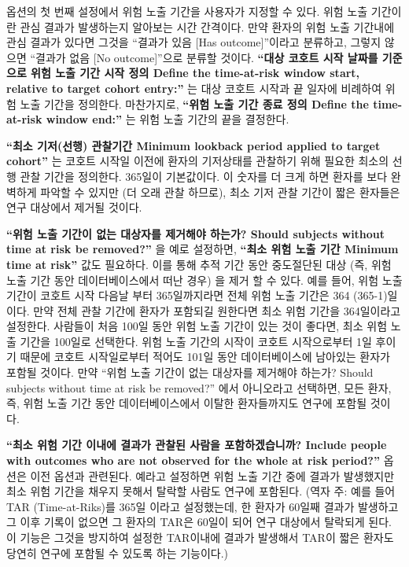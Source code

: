 \documentclass[10.5pt]{book}
\theoremstyle{definition}
\theoremstyle{definition}
\theoremstyle{definition}
\theoremstyle{remark}
\begin{document}
옵션의 첫 번째 설정에서 위험 노출 기간을 사용자가 지정할 수 있다. 위험
노출 기간이란 관심 결과가 발생하는지 알아보는 시간 간격이다. 만약 환자의
위험 노출 기간내에 관심 결과가 있다면 그것을 ``결과가 있음 {[}Has
outcome{]}''이라고 분류하고, 그렇지 않으면 ``결과가 없음 {[}No
outcome{]}''으로 분류할 것이다. \textbf{``대상 코호트 시작 날짜를
기준으로 위험 노출 기간 시작 정의 Define the time-at-risk window start,
relative to target cohort entry:''} 는 대상 코호트 시작과 끝 일자에
비례하여 위험 노출 기간을 정의한다. 마찬가지로, \textbf{``위험 노출 기간
종료 정의 Define the time-at-risk window end:''} 는 위험 노출 기간의
끝을 결정한다.

\textbf{``최소 기저(선행) 관찰기간 Minimum lookback period applied to
target cohort''} 는 코호트 시작일 이전에 환자의 기저상태를 관찰하기 위해
필요한 최소의 선행 관찰 기간을 정의한다. 365일이 기본값이다. 이 숫자를
더 크게 하면 환자를 보다 완벽하게 파악할 수 있지만 (더 오래 관찰
하므로), 최소 기저 관찰 기간이 짧은 환자들은 연구 대상에서 제거될
것이다.

\textbf{``위험 노출 기간이 없는 대상자를 제거해야 하는가? Should
subjects without time at risk be removed?''} 을 예로 설정하면,
\textbf{``최소 위험 노출 기간 Minimum time at risk''} 값도 필요하다.
이를 통해 추적 기간 동안 중도절단된 대상 (즉, 위험 노출 기간 동안
데이터베이스에서 떠난 경우) 을 제거 할 수 있다. 예를 들어, 위험 노출
기간이 코호트 시작 다음날 부터 365일까지라면 전체 위험 노출 기간은 364
(365-1)일이다. 만약 전체 관찰 기간에 환자가 포함되길 원한다면 최소 위험
기간을 364일이라고 설정한다. 사람들이 처음 100일 동안 위험 노출 기간이
있는 것이 좋다면, 최소 위험 노출 기간을 100일로 선택한다. 위험 노출
기간의 시작이 코호트 시작으로부터 1일 후이기 때문에 코호트 시작일로부터
적어도 101일 동안 데이터베이스에 남아있는 환자가 포함될 것이다. 만약
``위험 노출 기간이 없는 대상자를 제거해야 하는가? Should subjects
without time at risk be removed?'' 에서 아니오라고 선택하면, 모든 환자,
즉, 위험 노출 기간 동안 데이터베이스에서 이탈한 환자들까지도 연구에
포함될 것이다.

\textbf{``최소 위험 기간 이내에 결과가 관찰된 사람을 포함하겠습니까?
Include people with outcomes who are not observed for the whole at risk
period?''} 옵션은 이전 옵션과 관련된다. 예라고 설정하면 위험 노출 기간
중에 결과가 발생했지만 최소 위험 기간을 채우지 못해서 탈락할 사람도
연구에 포함된다. (역자 주: 예를 들어 TAR (Time-at-Riks)를 365일 이라고
설정했는데, 한 환자가 60일째 결과가 발생하고 그 이후 기록이 없으면 그
환자의 TAR은 60일이 되어 연구 대상에서 탈락되게 된다. 이 기능은 그것을
방지하여 설정한 TAR이내에 결과가 발생해서 TAR이 짧은 환자도 당연히
연구에 포함될 수 있도록 하는 기능이다.)
\end{document}
